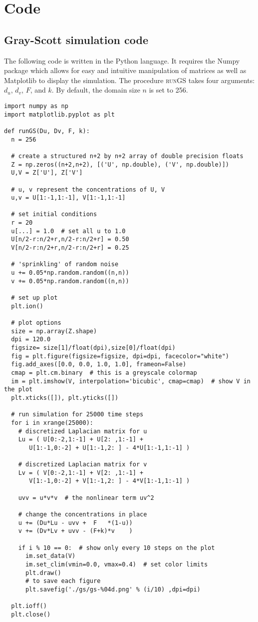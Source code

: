 \chapter{Code}

\section{Gray-Scott simulation code} \label{appB:gs-code}

The following code is written in the Python language. It requires the Numpy package which allows for easy and intuitive manipulation of matrices as well as Matplotlib to display the simulation. The procedure \textsc{runGS} takes four arguments: $d_u$, $d_v$, $F$, and $k$. By default, the domain size $n$ is set to 256.

\begin{Verbatim}[fontsize=\footnotesize,frame=leftline,framesep=5mm]
import numpy as np
import matplotlib.pyplot as plt

def runGS(Du, Dv, F, k):
  n = 256
  
  # create a structured n+2 by n+2 array of double precision floats
  Z = np.zeros((n+2,n+2), [('U', np.double), ('V', np.double)])
  U,V = Z['U'], Z['V']
  
  # u, v represent the concentrations of U, V
  u,v = U[1:-1,1:-1], V[1:-1,1:-1]
  
  # set initial conditions
  r = 20
  u[...] = 1.0  # set all u to 1.0
  U[n/2-r:n/2+r,n/2-r:n/2+r] = 0.50
  V[n/2-r:n/2+r,n/2-r:n/2+r] = 0.25
  
  # 'sprinkling' of random noise
  u += 0.05*np.random.random((n,n))
  v += 0.05*np.random.random((n,n))

  # set up plot
  plt.ion()

  # plot options
  size = np.array(Z.shape)
  dpi = 120.0
  figsize= size[1]/float(dpi),size[0]/float(dpi)
  fig = plt.figure(figsize=figsize, dpi=dpi, facecolor="white")
  fig.add_axes([0.0, 0.0, 1.0, 1.0], frameon=False)
  cmap = plt.cm.binary  # this is a greyscale colormap
  im = plt.imshow(V, interpolation='bicubic', cmap=cmap)  # show V in the plot
  plt.xticks([]), plt.yticks([])	

  # run simulation for 25000 time steps
  for i in xrange(25000):
    # discretized Laplacian matrix for u
    Lu = ( U[0:-2,1:-1] + U[2: ,1:-1] + 
       U[1:-1,0:-2] + U[1:-1,2: ] - 4*U[1:-1,1:-1] )
       
    # discretized Laplacian matrix for v
    Lv = ( V[0:-2,1:-1] + V[2: ,1:-1] + 
       V[1:-1,0:-2] + V[1:-1,2: ] - 4*V[1:-1,1:-1] )

    uvv = u*v*v  # the nonlinear term uv^2
      
    # change the concentrations in place
    u += (Du*Lu - uvv +  F   *(1-u))
    v += (Dv*Lv + uvv - (F+k)*v    )

    if i % 10 == 0:  # show only every 10 steps on the plot
      im.set_data(V)
      im.set_clim(vmin=0.0, vmax=0.4)  # set color limits
      plt.draw()
      # to save each figure
      plt.savefig('./gs/gs-%04d.png' % (i/10) ,dpi=dpi)

  plt.ioff()
  plt.close()
\end{Verbatim}

